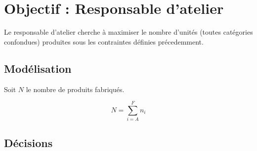 \newpage
\section{Objectif : Responsable d'atelier}
Le responsable d'atelier cherche à maximiser le nombre d'unités (toutes
catégories confondues) produites sous les contraintes définies précedemment.

\subsection{Modélisation}
Soit $N$ le nombre de produits fabriqués.

\begin{equation}
	N = \sum_{i = A}^{F} n_i
\end{equation} 

\subsection{Décisions}